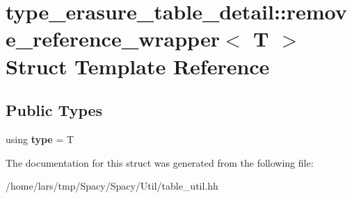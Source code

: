 \hypertarget{structtype__erasure__table__detail_1_1remove__reference__wrapper}{}\section{type\+\_\+erasure\+\_\+table\+\_\+detail\+:\+:remove\+\_\+reference\+\_\+wrapper$<$ T $>$ Struct Template Reference}
\label{structtype__erasure__table__detail_1_1remove__reference__wrapper}
\subsection*{Public Types}
\begin{DoxyCompactItemize}
\item 
using {\bfseries type} = T\hypertarget{structtype__erasure__table__detail_1_1remove__reference__wrapper_a691903c908bb15d5869ff168d269b23b}{}\label{structtype__erasure__table__detail_1_1remove__reference__wrapper_a691903c908bb15d5869ff168d269b23b}

\end{DoxyCompactItemize}


The documentation for this struct was generated from the following file\+:\begin{DoxyCompactItemize}
\item 
/home/lars/tmp/\+Spacy/\+Spacy/\+Util/table\+\_\+util.\+hh\end{DoxyCompactItemize}
